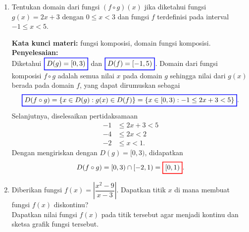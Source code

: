 \documentclass[10pt,openany,a4paper]{article}
\theoremstyle{definition}
\theoremstyle{definition}
\theoremstyle{plain}
\newenvironment{jawab}[2][tes]{%
\par\noindent\textbf{Kata kunci materi:} #1.\\
\textbf{Penyelesaian:} #2%
}{}
\begin{document}
\begin{enumerate}
\begin{jawab}[parabola, melengkapkan kuadrat, translasi grafik]
{\[        \setlength{\fboxrule}{1pt} \boxed{\color{oldcolor}\text{parabola } x=y^2 \text{ yang digeser 1 satuan ke bawah dan 2 satuan ke kanan}}\color{oldcolor}.\]
            }
            \end{jawab}
            \item Tentukan domain dari fungsi $(f\circ g)(x)$ jika diketahui fungsi $g(x)=2x+3$ dengan $0\leq x<3$ dan fungsi $f$ terdefinisi pada interval $-1\leq x <5$.
            \begin{jawab}[fungsi komposisi, domain fungsi komposisi]{~\\
                Diketahui $\colorlet{oldcolor}{.}
        \color{blue}
        \setlength{\fboxrule}{1pt} \boxed{\color{oldcolor}D(g)=[0,3)}\color{oldcolor}$ dan $\colorlet{oldcolor}{.}
        \color{blue}
        \setlength{\fboxrule}{1pt} \boxed{\color{oldcolor}D(f)=[-1,5)}\color{oldcolor}$. Domain dari fungsi komposisi $f\circ g$ adalah semua nilai $x$ pada domain $g$ sehingga nilai dari $g(x)$ berada pada domain $f$, yang dapat dirumuskan sebagai
                \begin{align*}
                    \colorlet{oldcolor}{.}
        \color{blue}
        \setlength{\fboxrule}{1pt} \boxed{\color{oldcolor}D(f\circ g) = \{x \in D(g) : g(x) \in D(f)\} = \{x \in [0, 3) : -1\leq 2x+3 < 5\}}\color{oldcolor}.
                \end{align*}
                Selanjutnya, diselesaikan pertidaksamaan
                \begin{align*}
                    -1 &\leq 2x+3 < 5\\
                    -4 &\leq 2x < 2\\
                    -2 &\leq x < 1.
                \end{align*}
                Dengan mengiriskan dengan $D(g)=[0,3)$, didapatkan
                \begin{align*}
                    D(f\circ g) = [0,3)\cap[-2,1) = \colorlet{oldcolor}{.}
        \color{red}
        \setlength{\fboxrule}{1pt} \boxed{\color{oldcolor}[0,1)}\color{oldcolor}.
                \end{align*}
            }
            \end{jawab}
            \item Diberikan fungsi $f(x)=\left|\dfrac{x^2-9}{x-3}\right|$. Dapatkan titik $x$ di mana membuat fungsi $f(x)$ diskontinu?\\
            Dapatkan nilai fungsi $f(x)$ pada titik tersebut agar menjadi kontinu dan sketsa grafik fungsi tersebut.

\end{enumerate}
\end{document}
